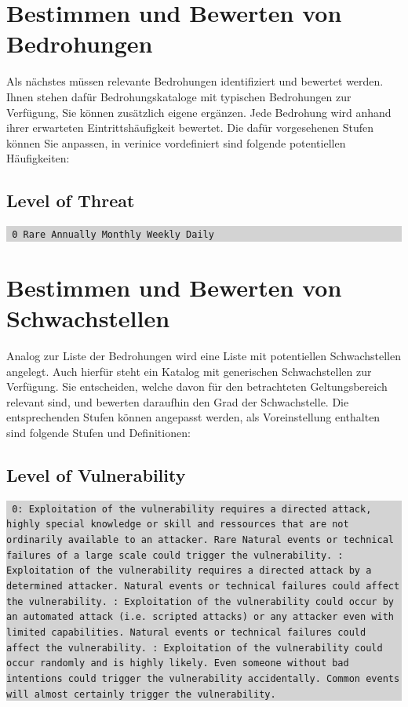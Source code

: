 \documentclass[a4paper,10pt]{book}
\begin{document}
\section{Bestimmen und Bewerten von Bedrohungen}
Als nächstes müssen relevante Bedrohungen identifiziert und bewertet werden. Ihnen stehen dafür Bedrohungskataloge mit typischen Bedrohungen zur
Verfügung, Sie können zusätzlich eigene ergänzen. Jede Bedrohung wird anhand ihrer
erwarteten Eintrittshäufigkeit bewertet. Die dafür vorgesehenen Stufen können Sie anpassen, in verinice vordefiniert sind folgende potentiellen
Häufigkeiten:

\subsection{Level of Threat}
\colorbox{lightgray}{\parbox{\textwidth}{
{\tt
0 Rare  Annually  Monthly  Weekly  Daily}
}}

\section{Bestimmen und Bewerten von Schwachstellen}
Analog zur Liste der Bedrohungen wird eine Liste mit potentiellen
Schwachstellen angelegt. Auch hierfür steht ein Katalog mit generischen
Schwachstellen zur Verfügung. Sie entscheiden, welche davon für den
betrachteten Geltungsbereich relevant sind, und bewerten daraufhin den Grad
der Schwachstelle. Die entsprechenden Stufen können angepasst werden, als
Voreinstellung enthalten sind folgende Stufen und Definitionen:

\subsection{Level of Vulnerability}
\colorbox{lightgray}{\parbox{\textwidth}{
{\tt
0: Exploitation of the vulnerability requires a directed attack, highly special
knowledge or skill and ressources that are not ordinarily available to an
attacker. Rare Natural events or technical failures of a large scale could
trigger the vulnerability.
\newline{}: Exploitation of the vulnerability requires a directed
attack by a determined attacker. Natural events or
technical failures could affect the vulnerability.
\newline{}: Exploitation of the vulnerability could occur by an
automated attack (i.e. scripted attacks) or any attacker
even with limited capabilities. Natural events or technical
failures could affect the vulnerability.
\newline{}: Exploitation of the vulnerability could occur randomly
and is highly likely. Even someone without bad intentions
could trigger the vulnerability accidentally. Common events
will almost certainly trigger the vulnerability.}
}}
\end{document}
